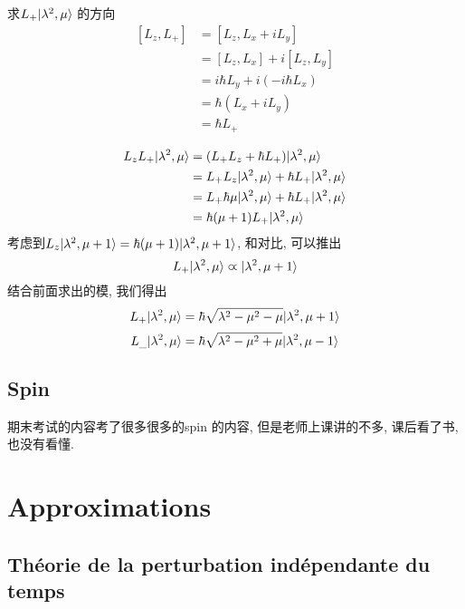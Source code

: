 求$L_+|\lambda^2, \mu\rangle$ 的方向
$$
\begin{aligned}
[L_z, L_+]
& = [L_z, L_x + i L_y] \\
& = [L_z, L_x] + i [L_z, L_y] \\
& = i\hbar L_y + i(-i\hbar L_x) \\
& = \hbar (L_x + i L_y) \\
& = \hbar L_+
\end{aligned}
$$

\begin{equation}
\begin{aligned}
L_zL_+|\lambda^2,\mu\rangle
& = (L_+L_z + \hbar L_+)|\lambda^2, \mu\rangle \\
& = L_+L_z|\lambda^2, \mu\rangle + \hbar L_+|\lambda^2, \mu\rangle \\
& = L_+ \hbar \mu |\lambda^2, \mu\rangle + \hbar L_+|\lambda^2, \mu\rangle \\
& = \hbar (\mu + 1) L_+ |\lambda^2, \mu\rangle
\end{aligned}
\end{equation}
考虑到$L_z |\lambda^2,\mu + 1\rangle = \hbar (\mu+1)|\lambda^2,\mu+1\rangle$, 和\lasteq 对比, 可以推出
$$
L_+|\lambda^2,\mu\rangle \varpropto |\lambda^2,\mu+1\rangle
$$
结合前面求出的模, 我们得出
$$ L_+ |\lambda^2,\mu\rangle = \hbar \sqrt{\lambda^2 - \mu^2 - \mu}|\lambda^2, \mu+1\rangle $$
$$ L_{\_} |\lambda^2,\mu\rangle = \hbar \sqrt{\lambda^2 - \mu^2 + \mu}|\lambda^2, \mu-1\rangle $$

\subsection{Spin}
期末考试的内容考了很多很多的spin 的内容, 但是老师上课讲的不多, 课后看了书, 也没有看懂.

\section{Approximations}
\subsection{Th\'eorie de la perturbation ind\'ependante du temps}
